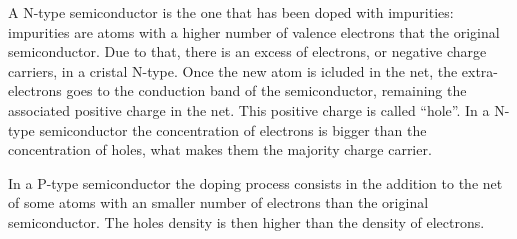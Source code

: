 
A N-type semiconductor is the one that has been doped with impurities: impurities are atoms with a higher number of valence electrons that the original semiconductor. Due to that, there is an excess of electrons, or negative charge carriers, in a cristal N-type. Once the new atom is icluded in the net, the extra-electrons goes to the conduction band of the semiconductor, remaining the associated positive charge in the net. This positive charge is called ``hole''. In a N-type semiconductor the concentration of electrons is bigger than the concentration of holes, what makes them the majority charge carrier. 


In a P-type semiconductor the doping process consists in the addition to the net of some atoms with an smaller number of electrons than the original semiconductor. The holes density is then higher than the density of electrons.


